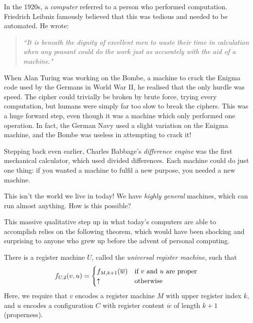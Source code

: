 \documentclass{article}
\begin{document}
\begin{remark}
	In the 1920s, a \textit{computer} referred to a person who performed computation. Friedrich Leibniz famously believed that this was tedious and needed to be automated. He wrote:
	    
	\begin{quotation}
		\textit{``It is beneath the dignity of excellent men to waste their time in calculation when any peasant could do the work just as accurately with the aid of a machine."}
	\end{quotation}
	    
	When Alan Turing was working on the Bombe, a machine to crack the Enigma code used by the Germans in World War II, he realised that the only hurdle was speed. The cipher could trivially be broken by brute force, trying every computation, but humans were simply far too slow to break the ciphers. This was a huge forward step, even though it was a machine which only performed one operation. In fact, the German Navy used a slight variation on the Enigma machine, and the Bombe was useless in attempting to crack it!
	    
	Stepping back even earlier, Charles Babbage's \textit{difference engine} was the first mechanical calculator, which used divided differences. Each machine could do just one thing: if you wanted a machine to fulfil a new purpose, you needed a new machine.
	    
	This isn't the world we live in today! We have \textit{highly general} machines, which can run almost anything. How is this possible?
\end{remark}

This massive qualitative step up in what today's computers are able to accomplish relies on the following theorem, which would have been shocking and surprising to anyone who grew up before the advent of personal computing.

\begin{theorem}
	\label{software-principle}
	There is a register machine $U$, called the \textit{universal register machine}, such that
	\[
		f_{U,2}(v, u) = \begin{cases}
		f_{M,k+1}(\overline w) & \text{if $v$ and $u$ are proper} \\
		\uparrow & \!\mathrel{\, \text{otherwise}}
		\end{cases}
	\]
	Here, we require that $v$ encodes a register machine $M$ with upper register index $k$, and $u$ encodes a configuration $C$ with register content $\overline w$ of length $k+1$ (properness).
\end{theorem}
\end{document}
